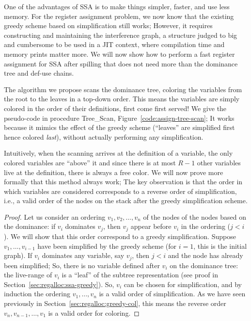 {One of the advantages of SSA is to make things simpler, faster, and use less memory. 
For the register assignment problem, we now know that the existing greedy scheme based on simplification still works; 
However, it requires constructing and maintaining the interference graph, a structure judged to big and cumbersome to be used in a JIT context, where compilation time and memory prints matter more. 
We will now show how to perform a fast register assignment for SSA after spilling that does not need more than the dominance tree and def-use chains. 

The algorithm we propose scans the dominance tree, coloring the variables from the root to the leaves in a top-down order.
This means the variables are simply colored in the order of their definitions, first come first served!
We give the pseudo-code in procedure Tree\_Scan, Figure~\ref{code:assign-tree-scan}; It works because it mimics the effect of the greedy scheme (``leaves'' are simplified first hence colored \emph{last}), without actually performing any simplification.

Intuitively, when the scanning arrives at the definition of a variable, the only colored variables are ``above'' it and since there is at most $R-1$ other variables live at the definition, there is always a free color.
We will now prove more formally that this method always work;
The key observation is that the order in which variables are considered corresponds to a reverse order of simplification, i.e., a valid order of the nodes on the stack after the greedy simplification scheme.

\begin{proof}
  \def\order{o}
  Let us consider an ordering $v_1, v_2, \ldots, v_n$ of the nodes of the nodes based on the dominance:
  if $v_i$ dominates $v_j$, then $v_j$ appear before $v_i$ in the ordering ($j < i$).
  We will show that this order correspond to a greedy simplification.
  Suppose $v_1, \ldots, v_{i-1}$ have been simplified by the greedy scheme (for $i=1$, this is the initial graph).
  If $v_i$ dominates any variable, say $v_j$, then $j < i$ and the node has already been simplified;
  So, there is no variable defined after $v_i$ on the dominance tree:
  the live-range of $v_i$ is a ``leaf'' of the subtree representation (see proof in Section~\ref{sec:regalloc:ssa-greedy}).
  So, $v_i$ can be chosen for simplification, and by induction the ordering $v_1, \ldots, v_n$ is a valid order of simplification. 
  As we have seen previously in Section~\ref{sec:regalloc:greedy-col}, this means the reverse order $v_n, v_{n-1}, \ldots, v_1$ is a valid order for coloring.
\end{proof}

}
